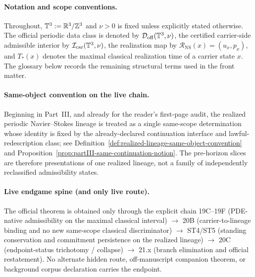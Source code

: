 \paragraph{Notation and scope conventions.}
Throughout, $\mathbb{T}^3:=\mathbb{R}^3/\mathbb{Z}^3$ and $\nu>0$ is fixed unless explicitly stated otherwise. The official periodic data class is denoted by $\mathcal D_{\mathrm{off}}(\mathbb{T}^3,\nu)$, the certified carrier-side admissible interior by $\mathcal I_{\mathrm{car}}(\mathbb{T}^3,\nu)$, the realization map by $\mathcal R_{\mathrm{NS}}(x)=(u_x,p_x)$, and $T_*(x)$ denotes the maximal classical realization time of a carrier state $x$. The glossary below records the remaining structural terms used in the front matter.

\paragraph{Same-object convention on the live chain.}
Beginning in Part~III, and already for the reader's first-page audit, the realized periodic Navier--Stokes lineage is treated as a single same-scope determination whose identity is fixed by the already-declared continuation interface and lawful-redescription class; see Definition~\ref{def:realized-lineage-same-object-convention} and Proposition~\ref{prop:partIII-same-continuation-notion}. The pre-horizon slices are therefore presentations of one realized lineage, not a family of independently reclassified admissibility states.

\paragraph{Live endgame spine (and only live route).}
The official theorem is obtained only through the explicit chain 19C--19F (PDE-native admissibility on the maximal classical interval) $\to$ 20B (carrier-to-lineage binding and no new same-scope classical discriminator) $\to$ ST4/ST5 (standing conservation and commitment persistence on the realized lineage) $\to$ 20C (endpoint-status trichotomy / collapse) $\to$ 21.x (branch elimination and official restatement). No alternate hidden route, off-manuscript companion theorem, or background corpus declaration carries the endpoint.

